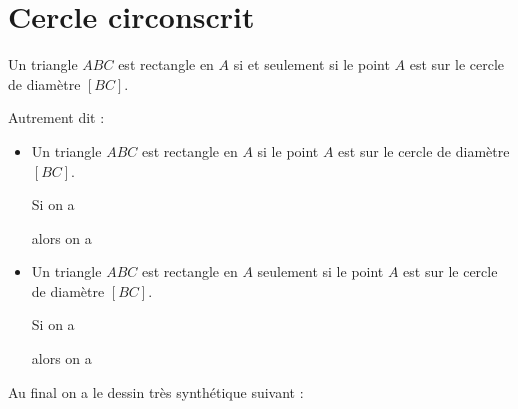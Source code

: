 





\section{Cercle circonscrit}

\begin{propriete}
    Un triangle \( ABC\) est rectangle en \( A\) si et seulement si le point \( A\) est sur le cercle de diamètre \( [BC]\).
\end{propriete}
Autrement dit :
\begin{itemize}
    \item
        Un triangle \( ABC\) est rectangle en \( A\) si le point \( A\) est sur le cercle de diamètre \( [BC]\).

        Si on a
 
 alors on a 
         

    \item
        Un triangle \( ABC\) est rectangle en \( A\) seulement si le point \( A\) est sur le cercle de diamètre \( [BC]\).

        Si on a
 
 alors on a 
         

\end{itemize}

Au final on a le dessin très synthétique suivant :
\begin{center}
   
\end{center}


